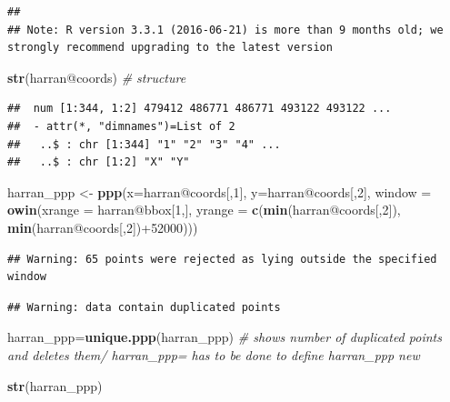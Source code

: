 \documentclass[]{article}
\newenvironment{Shaded}{\begin{snugshade}}{\end{snugshade}}
\newcommand{\KeywordTok}[1]{\textcolor[rgb]{0.13,0.29,0.53}{\textbf{{#1}}}}
\newcommand{\DataTypeTok}[1]{\textcolor[rgb]{0.13,0.29,0.53}{{#1}}}
\newcommand{\DecValTok}[1]{\textcolor[rgb]{0.00,0.00,0.81}{{#1}}}
\newcommand{\StringTok}[1]{\textcolor[rgb]{0.31,0.60,0.02}{{#1}}}
\newcommand{\CommentTok}[1]{\textcolor[rgb]{0.56,0.35,0.01}{\textit{{#1}}}}
\newcommand{\NormalTok}[1]{{#1}}
\begin{document}
\begin{verbatim}
## 
## Note: R version 3.3.1 (2016-06-21) is more than 9 months old; we strongly recommend upgrading to the latest version
\end{verbatim}

\begin{Shaded}
\begin{Highlighting}[]
\KeywordTok{str}\NormalTok{(harran@coords) }\CommentTok{# structure}
\end{Highlighting}
\end{Shaded}

\begin{verbatim}
##  num [1:344, 1:2] 479412 486771 486771 493122 493122 ...
##  - attr(*, "dimnames")=List of 2
##   ..$ : chr [1:344] "1" "2" "3" "4" ...
##   ..$ : chr [1:2] "X" "Y"
\end{verbatim}

\begin{Shaded}
\begin{Highlighting}[]
\NormalTok{harran_ppp <-}\StringTok{ }\KeywordTok{ppp}\NormalTok{(}\DataTypeTok{x=}\NormalTok{harran@coords[,}\DecValTok{1}\NormalTok{],}
                  \DataTypeTok{y=}\NormalTok{harran@coords[,}\DecValTok{2}\NormalTok{],}
                  \DataTypeTok{window =} \KeywordTok{owin}\NormalTok{(}\DataTypeTok{xrange =} \NormalTok{harran@bbox[}\DecValTok{1}\NormalTok{,],}
                                \DataTypeTok{yrange =} \KeywordTok{c}\NormalTok{(}\KeywordTok{min}\NormalTok{(harran@coords[,}\DecValTok{2}\NormalTok{]),}
                                           \KeywordTok{min}\NormalTok{(harran@coords[,}\DecValTok{2}\NormalTok{])+}\DecValTok{52000}\NormalTok{)))}
\end{Highlighting}
\end{Shaded}

\begin{verbatim}
## Warning: 65 points were rejected as lying outside the specified window
\end{verbatim}

\begin{verbatim}
## Warning: data contain duplicated points
\end{verbatim}

\begin{Shaded}
\begin{Highlighting}[]
\NormalTok{harran_ppp=}\KeywordTok{unique.ppp}\NormalTok{(harran_ppp) }\CommentTok{# shows number of duplicated points and deletes them/ harran_ppp= has to be done to define harran_ppp new}

\KeywordTok{str}\NormalTok{(harran_ppp)}
\end{Highlighting}
\end{Shaded}
\end{document}
